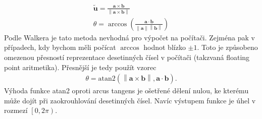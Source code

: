 \documentclass[twoside]{ctuthesis}
\newcommand{\norm}[1]{\left\lVert#1\right\rVert}
\begin{document}
\begin{align}
    \tilde{\mathbf{u}} = \frac{\mathbf{a} \times \mathbf{b}}{\norm{\mathbf{a}\times \mathbf{b}}} \label{eq:vector_rogrig}\\
    \theta = \arccos \left( \frac{\mathbf{a} \cdot \mathbf{b}}{\norm{\mathbf{a}}\norm{\mathbf{b}}} \right) \label{eq:angle_rogrig}
\end{align}
Podle Walkera \cite{james_w_angle_2014} je tato metoda nevhodná pro výpočet na počítači. Zejména pak v případech, kdy bychom měli počícat $\arccos$ hodnot blízko $\pm 1$. Toto je způsobeno omezenou přesností reprezentace desetinných čísel v počítači (takzvaná floating point aritmetika). Přesnější je tedy použít vzorec
\begin{align}
    \theta = \text{atan2}\left( \norm{\mathbf{a} \times \mathbf{b}}, \mathbf{a}\cdot \mathbf{b} \right).
\end{align}
Výhoda funkce atan2 oproti arcus tangens je ošetřené dělení nulou, ke kterému může dojít při zaokrouhlování desetinných čísel. Navíc výstupem funkce je úhel v rozmezí $\left[ 0, 2\pi \right)$.
\end{document}
